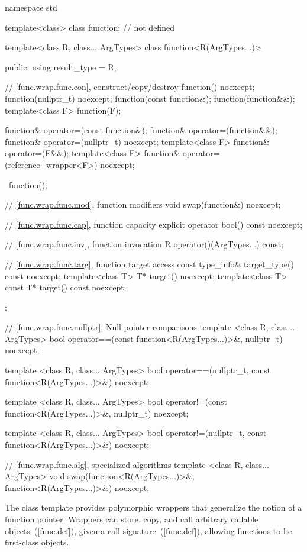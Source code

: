 \begin{codeblock}
namespace std {
  template<class> class function; // not defined

  template<class R, class... ArgTypes>
  class function<R(ArgTypes...)> {
  public:
    using result_type = R;

    // \ref{func.wrap.func.con}, construct/copy/destroy
    function() noexcept;
    function(nullptr_t) noexcept;
    function(const function&);
    function(function&&);
    template<class F> function(F);

    function& operator=(const function&);
    function& operator=(function&&);
    function& operator=(nullptr_t) noexcept;
    template<class F> function& operator=(F&&);
    template<class F> function& operator=(reference_wrapper<F>) noexcept;

    ~function();

    // \ref{func.wrap.func.mod}, function modifiers
    void swap(function&) noexcept;

    // \ref{func.wrap.func.cap}, function capacity
    explicit operator bool() const noexcept;

    // \ref{func.wrap.func.inv}, function invocation
    R operator()(ArgTypes...) const;

    // \ref{func.wrap.func.targ}, function target access
    const type_info& target_type() const noexcept;
    template<class T>       T* target() noexcept;
    template<class T> const T* target() const noexcept;

  };

  // \ref{func.wrap.func.nullptr}, Null pointer comparisons
  template <class R, class... ArgTypes>
    bool operator==(const function<R(ArgTypes...)>&, nullptr_t) noexcept;

  template <class R, class... ArgTypes>
    bool operator==(nullptr_t, const function<R(ArgTypes...)>&) noexcept;

  template <class R, class... ArgTypes>
    bool operator!=(const function<R(ArgTypes...)>&, nullptr_t) noexcept;

  template <class R, class... ArgTypes>
    bool operator!=(nullptr_t, const function<R(ArgTypes...)>&) noexcept;

  // \ref{func.wrap.func.alg}, specialized algorithms
  template <class R, class... ArgTypes>
    void swap(function<R(ArgTypes...)>&, function<R(ArgTypes...)>&) noexcept;
}
\end{codeblock}

\pnum
The  class template provides polymorphic wrappers that
generalize the notion of a function pointer. Wrappers can store, copy,
and call arbitrary callable objects~(\ref{func.def}), given a call
signature~(\ref{func.def}), allowing functions to be first-class objects.

